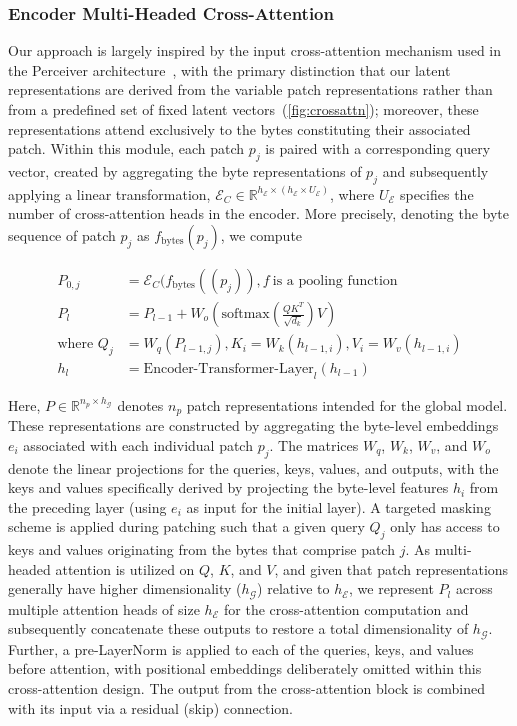 \subsubsection{Encoder Multi-Headed Cross-Attention}
\label{sec:enc-cross-attn}
Our approach is largely inspired by the input cross-attention mechanism used in the Perceiver architecture~\citep{jaegle2021perceiver}, with the primary distinction that our latent representations are derived from the variable patch representations rather than from a predefined set of fixed latent vectors~(\autoref{fig:crossattn}); moreover, these representations attend exclusively to the bytes constituting their associated patch. Within this module, each patch $p_j$ is paired with a corresponding query vector, created by aggregating the byte representations of $p_j$ and subsequently applying a linear transformation, $\mathcal{E}_{C} \in \mathbb{R}^{h_{\mathcal{E}} \times (h_{\mathcal{E}} \times U_{\mathcal{E}})}$, where $U_{\mathcal{E}}$ specifies the number of cross-attention heads in the encoder. More precisely, denoting the byte sequence of patch $p_j$ as $f_{\text{bytes}}(p_j)$, we compute

\begin{align}
P_{0,j} &= \mathcal{E}_{C}(f_\text{bytes}((p_j)), f~ \text{is a pooling function} \\
P_l &= P_{l-1} + W_o\left(\text{softmax}\left(\frac{QK^T}{\sqrt{d_k}}\right)V\right) \\
\text{where } Q_j &= W_q(P_{l-1,j}), K_i = W_k(h_{l-1,i}), V_i = W_v(h_{l-1,i}) \\
h_l &= \text{Encoder-Transformer-Layer}_l(h_{l-1})
\end{align}

Here, $P \in \mathbb{R}^{n_p \times h_{\mathcal{G}}}$ denotes $n_p$ patch representations intended for the global model. These representations are constructed by aggregating the byte-level embeddings $e_i$ associated with each individual patch $p_j$. The matrices $W_q$, $W_k$, $W_v$, and $W_o$ denote the linear projections for the queries, keys, values, and outputs, with the keys and values specifically derived by projecting the byte-level features $h_i$ from the preceding layer (using $e_i$ as input for the initial layer). A targeted masking scheme is applied during patching such that a given query $Q_j$ only has access to keys and values originating from the bytes that comprise patch $j$. As multi-headed attention is utilized on $Q$, $K$, and $V$, and given that patch representations generally have higher dimensionality ($h_{\mathcal{G}}$) relative to $h_{\mathcal{E}}$, we represent $P_l$ across multiple attention heads of size $h_{\mathcal{E}}$ for the cross-attention computation and subsequently concatenate these outputs to restore a total dimensionality of $h_{\mathcal{G}}$. Further, a pre-LayerNorm is applied to each of the queries, keys, and values before attention, with positional embeddings deliberately omitted within this cross-attention design. The output from the cross-attention block is combined with its input via a residual (skip) connection.

